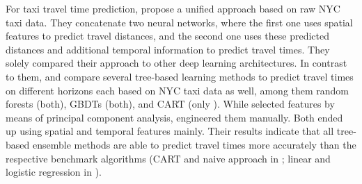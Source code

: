 For taxi travel time prediction, \cite{jindal2017unified} propose a unified approach based on raw NYC taxi data. They concatenate two neural networks, where the first one uses spatial features to predict travel distances, and the second one uses these predicted distances and additional temporal information to predict travel times. They solely compared their approach to other deep learning architectures.
In contrast to them, \cite{Huang2018_GBDT} and \cite{huang2020travel_GBDT} compare several tree-based learning methods to predict travel times on different horizons each based on NYC taxi data as well, among them random forests (both), GBDTs (both), and CART (only \cite{huang2020travel_GBDT}). While \cite{Huang2018_GBDT} selected features by means of principal component analysis, \cite{huang2020travel_GBDT} engineered them manually. Both ended up using spatial and temporal features mainly. Their results indicate that all tree-based ensemble methods are able to predict travel times more accurately than the respective benchmark algorithms (CART and naive approach in \cite{huang2020travel_GBDT}; linear and logistic regression in \cite{Huang2018_GBDT}).



